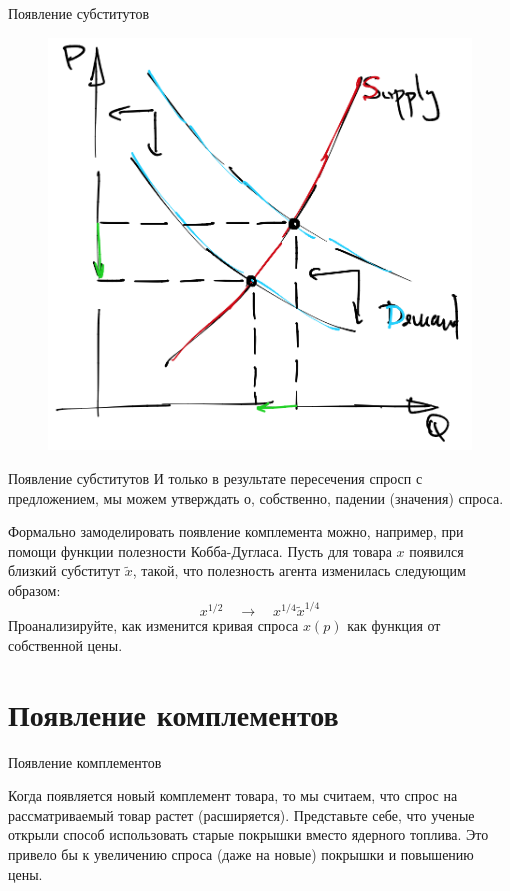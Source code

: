 \documentclass{beamer}
\begin{document}
\begin{frame}{Появление субститутов}
\begin{figure}[hbt]
\centering
\includegraphics[width=.7 \textwidth]{dem_contract.png}
\end{figure}
\end{frame}

\begin{frame}{Появление субститутов}
И только в результате пересечения спросп с предложением, мы можем утверждать о, собственно, падении (значения) спроса.

Формально замоделировать появление комплемента можно, например, при помощи функции полезности Кобба-Дугласа. Пусть для товара $x$ появился близкий субститут $\tilde x$, такой, что полезность агента изменилась следующим образом:
$$ x^{1/2} \quad \to \quad x^{1/4}\tilde x^{1/4}$$
Проанализируйте, как изменится кривая спроса $x(p)$ как функция от собственной цены.

\end{frame}

\section{Появление комплементов}

\begin{frame}{Появление комплементов}

Когда появляется новый комплемент товара, то мы считаем, что спрос на рассматриваемый товар растет (расширяется). Представьте себе, что ученые открыли способ использовать старые покрышки вместо ядерного топлива. Это привело бы к увеличению спроса (даже на новые) покрышки и повышению цены.

\end{frame}
\end{document}
